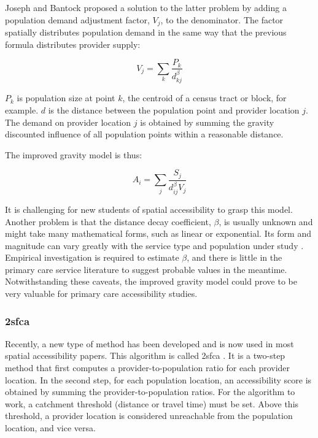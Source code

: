 Joseph and Bantock \cite{joseph_measuring_1982} proposed a solution to the latter problem by adding a population demand adjustment factor, $V_j$, to the denominator. The factor spatially distributes population demand in the same way that the previous formula distributes provider supply:

\begin{equation}
    V_j = \sum_k \frac{P_k}{d_{kj}^{\beta}}
\end{equation}

$P_k$ is population size at point $k$, the centroid of a census tract or block, for example. $d$ is the distance between the population point and provider location $j$. The demand on provider location $j$ is obtained by summing the gravity discounted influence of all population points within a reasonable distance.

The improved gravity model is thus:

\begin{equation}
    A_i = \sum_j \frac{S_j}{d_{ij}^{\beta} V_j}
\end{equation}

It is challenging for new students of spatial accessibility to grasp this model. Another problem is that the distance decay coefficient, $\beta$, is usually unknown and might take many mathematical forms, such as linear or exponential. Its form and magnitude can vary greatly with the service type and population under study \cite{talen_assessing_1998}. Empirical investigation is required to estimate $\beta$, and there is little in the primary care service literature to suggest probable values in the meantime. Notwithstanding these caveats, the improved gravity model could prove to be very valuable for primary care accessibility studies.

\subsubsection*{\acf{2sfca}}

Recently, a new type of method has been developed and is now used in most spatial accessibility papers. This algorithm is called \ac{2sfca} \cite{luo_using_2004}. It is a two-step method that first computes a provider-to-population ratio for each provider location. In the second step, for each population location, an accessibility score is obtained by summing the provider-to-population ratios. For the algorithm to work, a catchment threshold (distance or travel time) must be set. Above this threshold, a provider location is considered unreachable from the population location, and vice versa.

